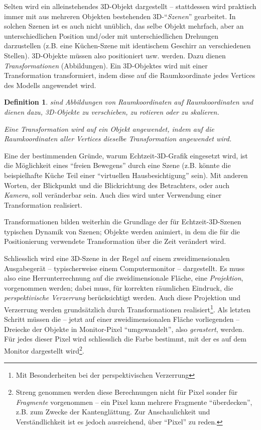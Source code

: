 \documentclass[twoside,a4paper,fleqn,12pt]{book}
\newtheorem{defn}{Definition}
\begin{document}
Selten wird ein alleinstehendes 3D-Objekt dargestellt -- stattdessen wird praktisch immer mit aus mehreren Objekten
bestehenden 3D-"`\emph{Szenen}"' gearbeitet. In solchen Szenen ist es auch nicht unüblich, das selbe Objekt mehrfach,
aber an unterschiedlichen Position \mbox{und/oder} mit unterschiedlichen Drehungen darzustellen (z.B. eine Küchen-Szene mit identischem
Geschirr an verschiedenen Stellen). 3D-Objekte müssen also positioniert usw. werden. Dazu dienen \emph{Transformationen}
(Abbildungen). Ein 3D-Objektes wird mit einer Transformation transformiert, indem diese auf die Raumkoordinate jedes Vertices
des Modells angewendet wird.

\begin{defn}
 sind Abbildungen von Raumkoordinaten auf Raumkoordinaten und dienen dazu,
3D-Objekte zu verschieben, zu rotieren oder zu skalieren.

Eine Transformation wird auf ein Objekt angewendet, indem auf die Raumkoordinaten aller Vertices dieselbe Transformation angewendet wird.
\end{defn}


Eine der bestimmenden Gründe, warum Echtzeit-3D-Grafik eingesetzt wird, ist die Möglichkeit eines "`freien Bewegens"' durch
eine Szene (z.B. könnte die beispielhafte Küche Teil einer "`virtuellen Hausbesichtigung"' sein).
Mit anderen Worten, der Blickpunkt und die Blickrichtung des Betrachters, oder auch \emph{Kamera}, soll veränderbar sein.
Auch dies wird unter Verwendung einer Transformation realisiert.

Transformationen bilden weiterhin die Grundlage der für Echtzeit-3D-Szenen typischen Dynamik von Szenen; Objekte werden animiert,
in dem die für die Positionierung verwendete Transformation über die Zeit verändert wird.

Schliesslich wird eine 3D-Szene in der Regel auf einem zweidimensionalen Ausgabegerät -- typischerweise einem Computermonitor --
dargestellt. Es muss also eine Herrunterrechnung auf die zweidimensionale Fläche, eine \emph{Projektion}, vorgenommen werden;
dabei muss, für korrekten räumlichen Eindruck, die \emph{perspektivische Verzerrung} berücksichtigt werden.
Auch diese Projektion und Verzerrung werden grundsätzlich durch Transformationen realisiert\footnote{Mit Besonderheiten bei der perspektivischen Verzerrung}.
Als letzten Schritt müssen die -- jetzt auf einer zweidimensionalen Fläche vorliegenden -- Dreiecke der Objekte
in Monitor-Pixel "`umgewandelt"', also \emph{gerastert}, werden. Für jedes dieser Pixel wird schliesslich die Farbe bestimmt,
mit der es auf dem Monitor dargestellt wird\footnote{Streng genommen werden diese Berechnungen nicht für Pixel sonder für \emph{Fragmente} vorgenommen --
ein Pixel kann mehrere Fragmente "`überdecken"', z.B. zum Zwecke der Kantenglättung. Zur Anschaulichkeit und Verständlichkeit ist es jedoch
ausreichend, über "`Pixel"' zu reden.}.
\end{document}
